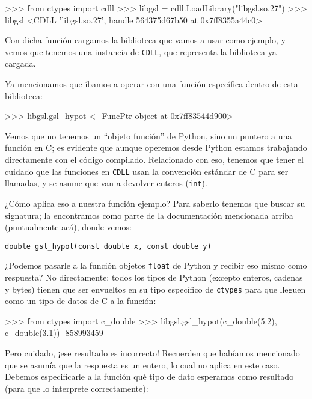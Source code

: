 \begin{py}
>>> from ctypes import cdll
>>> libgsl = cdll.LoadLibrary("libgsl.so.27")
>>> libgsl
<CDLL 'libgsl.so.27', handle 564375d67b50 at 0x7ff8355a44c0>
\end{py}

Con dicha función cargamos la biblioteca que vamos a usar como ejemplo, y vemos que tenemos una instancia de \texttt{CDLL}, que representa la biblioteca ya cargada. 

Ya mencionamos que íbamos a operar con una función específica dentro de esta biblioteca:

\begin{py}
>>> libgsl.gsl_hypot
<_FuncPtr object at 0x7ff83544d900>
\end{py}

Vemos que no tenemos un ``objeto función'' de Python, sino un puntero a una función en C; es evidente que aunque operemos desde Python estamos trabajando directamente con el código compilado. Relacionado con eso, tenemos que tener el cuidado que las funciones en \texttt{CDLL} usan la convención estándar de C para ser llamadas, y se asume que van a devolver enteros (\texttt{int}).

¿Cómo aplica eso a nuestra función ejemplo? Para saberlo tenemos que buscar su signatura; la encontramos como parte de la documentación mencionada arriba (\href{https://www.gnu.org/savannah-checkouts/gnu/gsl/doc/html/math.html#c.gsl_hypot}{puntualmente acá}), donde vemos:

\begin{verbatim}
double gsl_hypot(const double x, const double y)
\end{verbatim}

¿Podemos pasarle a la función objetos \texttt{float} de Python y recibir eso mismo como respuesta? No directamente: todos los tipos de Python (excepto enteros, cadenas y bytes) tienen que ser envueltos en su tipo específico de \texttt{ctypes} para que lleguen como un tipo de datos de C a la función:

\begin{py}
>>> from ctypes import c_double
>>> libgsl.gsl_hypot(c_double(5.2), c_double(3.1))
-858993459
\end{py}

Pero cuidado, ¡ese resultado es incorrecto! Recuerden que habíamos mencionado que se asumía que la respuesta es un entero, lo cual no aplica en este caso. Debemos especificarle a la función qué tipo de dato esperamos como resultado (para que lo interprete correctamente):

